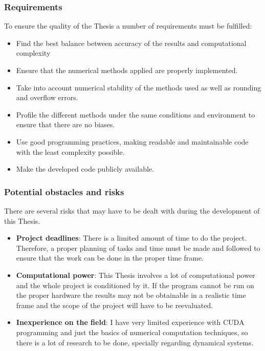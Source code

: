 \subsubsection{Requirements}

To ensure the quality of the Thesis a number of requirements must be fulfilled:
\begin{itemize}
    \item Find the best balance between accuracy of the results and computational complexity
    \item Ensure that the numerical methods applied are properly implemented.
    \item Take into account numerical stability of the methods used as well as rounding and overflow errors.
    \item Profile the different methods under the same conditions and environment to ensure that there are no biases.
    \item Use good programming practices, making readable and maintainable code with the least complexity possible.
    \item Make the developed code publicly available.
\end{itemize}

\subsubsection{Potential obstacles and risks}%
\label{ssub:intro_risks}

There are several risks that may have to be dealt with during the development of this Thesis.

\begin{itemize}
    \item \textbf{Project deadlines}: There is a limited amount of time to do
        the project. Therefore, a proper planning of tasks and time must be made
        and followed to ensure that the work can be done in the proper time
        frame.
    \item \textbf{Computational power}: This Thesis involves a lot of
        computational power and the whole project is conditioned by it. If the
        program cannot be run on the proper hardware the results may not be
        obtainable in a realistic time frame and the scope of the project will
        have to be reevaluated.
    \item \textbf{Inexperience on the field}: I have very limited experience
        with CUDA programming and just the basics of numerical computation
        techniques, so there is a lot of research to be done, specially regarding
        dynamical systems.
\end{itemize}


